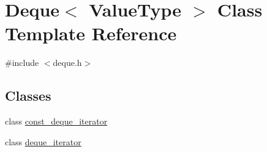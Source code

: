 \hypertarget{classDeque}{}\section{Deque$<$ Value\+Type $>$ Class Template Reference}
\label{classDeque}


{\ttfamily \#include $<$deque.\+h$>$}

\subsection*{Classes}
\begin{DoxyCompactItemize}
\item 
class \mbox{\hyperlink{classDeque_1_1const__deque__iterator}{const\+\_\+deque\+\_\+iterator}}
\item 
class \mbox{\hyperlink{classDeque_1_1deque__iterator}{deque\+\_\+iterator}}
\end{DoxyCompactItemize}
